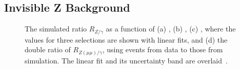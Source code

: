\subsection{Invisible Z Background}
\label{subsec:RA2_Zinv}
\begin{figure}[!t]
  \centering
{}
  \caption{The simulated ratio $R_{Z/\gamma}$ as a function of (a) \MHT, (b) \HT, (c) \NJets, where the values for three \MHT selections are shown with linear fits, and (d) the double ratio of $R_{Z(\mu\mu)/\gamma}$, using events from data to those from simulation. The linear fit and its uncertainty band are overlaid~\cite{Chatrchyan:2014lfa}.}
  \label{fig:ra2_zinv}
\end{figure}
